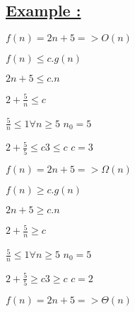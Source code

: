 \subsection*{\underline{Example :}}
\(f(n) = 2n + 5 => O(n)\)
 
\vspace{0.5cm} 
\hspace{9cm}\(f(n) \leq c.g(n)\)

\vspace{0.15cm}
\hspace{9cm}\(2n+5 \leq c.n\)

\vspace{0.15cm}
\hspace{9cm}\(2 + \frac{5}{n} \leq c\) 

\vspace{0.15cm}
\hspace{7.75cm}\(\frac{5}{n} \leq 1\)\quad \quad \(\forall n \geq 5\) \quad \(\boxed{n_0 = 5}\)

\vspace{0.15cm}
\hspace{7.75cm}\(2 + \frac {5}{5} \leq c\)\quad \(3 \leq c\)\hspace{0.5cm} \(\boxed{c = 3}\)

\vspace{1cm}

\(f(n) = 2n + 5 => \Omega (n)\)

\vspace{0.5cm} 
\hspace{9cm}\(f(n) \geq c.g(n)\)

\vspace{0.15cm}
\hspace{9cm}\(2n+5 \geq c.n\)

\vspace{0.15cm}
\hspace{9cm}\(2 + \frac{5}{n} \geq c\) 

\vspace{0.15cm}
\hspace{7.75cm}\(\frac{5}{n} \leq 1\)\quad \quad \(\forall n \geq 5\) \quad \(\boxed{n_0 = 5}\)

\vspace{0.15cm}
\hspace{7.75cm}\(2 + \frac {5}{5} \geq c\)\quad \(3 \geq c\)\hspace{0.5cm} \(\boxed{c = 2}\)

\vspace{1cm}

\(f(n) = 2n + 5 => \Theta (n)\)

